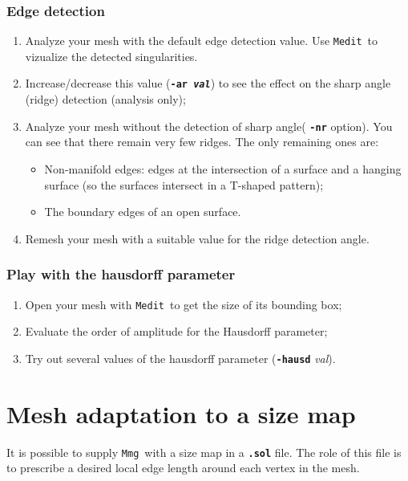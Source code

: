 \documentclass{article}
\newcommand{\ttb}[1]{\texttt{\textbf{#1}}}
\newcommand{\mmg}{\texttt{Mmg}}
\newcommand{\medit}{\texttt{Medit}}
\begin{document}
\subsubsection{Edge detection}
\begin{enumerate}
\item Analyze your mesh with the default edge detection value. Use
  \medit\ to vizualize the detected singularities.
\item Increase/decrease this value (\ttb{-ar \textit{val}}) to see the
  effect on the sharp angle (ridge) detection (analysis only);
\item Analyze your mesh without the detection of sharp angle( \ttb{-nr} option).
You can see that there remain very few ridges. The only remaining ones are:
\begin{itemize}
\item Non-manifold edges: edges at the intersection of a surface and
  a hanging surface (so the surfaces intersect in a T-shaped pattern);
\item The boundary edges of an open surface.
\end{itemize}
\item Remesh your mesh with a suitable value for the ridge detection angle.
\end{enumerate}

\subsubsection{Play with the hausdorff parameter}
\begin{enumerate}
\item Open your mesh with \medit\ to get the size of its bounding box;
\item Evaluate the order of amplitude for the Hausdorff parameter;
\item Try out several values of the hausdorff parameter (\ttb{-hausd} \textit{val}).
\end{enumerate}

\section{Mesh adaptation to a size map}\label{sec.meshsizemap}
It is possible to supply \mmg\ with a size map in a \ttb{.sol} file. The role of this file
is to prescribe a desired local edge length around each vertex in the mesh. 
\end{document}
